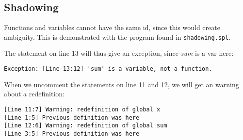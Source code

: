 \documentclass[a4paper]{article}
\begin{document}
\subsection{Shadowing}
Functions and variables cannot have the same id, since this would create ambiguity. This is demonstrated with the program found in {\tt shadowing.spl}.

The statement on line 13 will thus give an exception, since \emph{sum} is a var here: 
\begin{verbatim}
Exception: [Line 13:12] 'sum' is a variable, not a function.
\end{verbatim}

When we uncomment the statements on line 11 and 12, we will get an warning about a redefinition:
\begin{verbatim}
[Line 11:7] Warning: redefinition of global x
[Line 1:5] Previous definition was here
[Line 12:6] Warning: redefinition of global sum
[Line 3:5] Previous definition was here
\end{verbatim}
\end{document}
